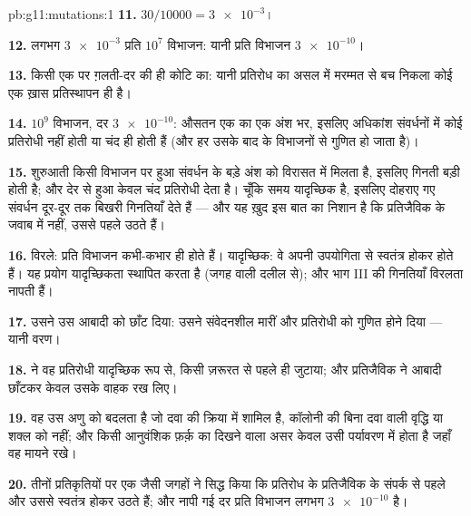 \begin{solution}{pb:g11:mutations:1}
\textbf{11.} $30/\num{10000} = \num{3e-3}$।

\textbf{12.} लगभग $\num{3e-3}$  प्रति $10^7$ विभाजन: यानी
प्रति विभाजन $\num{3e-10}$।

\textbf{13.} किसी एक  पर ग़लती-दर की ही कोटि का: यानी
प्रतिरोध का  असल में मरम्मत से बच निकला कोई एक ख़ास
प्रतिस्थापन ही है।

\textbf{14.} $10^9$ विभाजन, दर $\num{3e-10}$: औसतन एक  का एक
अंश भर, इसलिए अधिकांश संवर्धनों में कोई प्रतिरोधी  नहीं होती या चंद
ही होती हैं (और हर  उसके बाद के विभाजनों से गुणित हो जाता है)।

\textbf{15.} शुरुआती किसी विभाजन पर हुआ  संवर्धन के बड़े अंश
को विरासत में मिलता है, इसलिए गिनती बड़ी होती है; और देर से हुआ केवल चंद
प्रतिरोधी  देता है। चूँकि समय यादृच्छिक है, इसलिए दोहराए गए
संवर्धन दूर-दूर तक बिखरी गिनतियाँ देते हैं --- और यह ख़ुद इस बात का निशान
है कि  प्रतिजैविक के जवाब में नहीं, उससे पहले उठते हैं।

\textbf{16.} विरले: प्रति विभाजन  कभी-कभार ही होते हैं।
यादृच्छिक: वे अपनी उपयोगिता से स्वतंत्र होकर होते हैं। यह प्रयोग
यादृच्छिकता स्थापित करता है (जगह वाली दलील से); और भाग III की गिनतियाँ
विरलता नापती हैं।

\textbf{17.} उसने उस आबादी को छाँट दिया: उसने संवेदनशील  मारीं
और प्रतिरोधी  को गुणित होने दिया --- यानी वरण।

\textbf{18.}  ने वह प्रतिरोधी  यादृच्छिक रूप से, किसी
ज़रूरत से पहले ही जुटाया; और प्रतिजैविक ने आबादी छाँटकर केवल उसके वाहक
रख लिए।

\textbf{19.} वह  उस अणु को बदलता है जो दवा की क्रिया में शामिल
है, कॉलोनी की बिना दवा वाली वृद्धि या शक्ल को नहीं; और किसी आनुवंशिक
फ़र्क़ का दिखने वाला असर केवल उसी पर्यावरण में होता है जहाँ वह मायने रखे।

\textbf{20.} तीनों प्रतिकृतियों पर एक जैसी जगहों ने सिद्ध किया कि
प्रतिरोध के  प्रतिजैविक के संपर्क से पहले और उससे स्वतंत्र
होकर उठते हैं; और नापी गई दर प्रति  विभाजन लगभग $\num{3e-10}$ है।
\end{solution}
